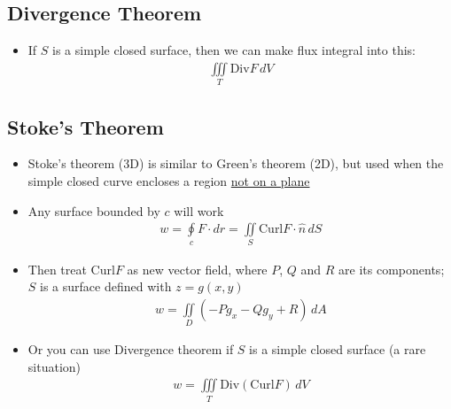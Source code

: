 \documentclass{article}
\begin{document}
\subsection{Divergence Theorem}
\begin{itemize}
  \item If $S$ is a simple closed surface, then we can make flux integral into this:
  \begin{align}
    \iiint\limits_T \textrm{Div}F \, dV
  \end{align}
\end{itemize}

\subsection{Stoke's Theorem}
\begin{itemize}
  \item Stoke's theorem (3D) is similar to Green's theorem (2D), but used when the simple closed curve encloses a region \underline{not on a plane}
  \item Any surface bounded by $c$ will work
  \begin{align}
    w = \oint\limits_c F\cdot dr = \iint\limits_S \textrm{Curl}F\cdot\hat{n} \, dS
  \end{align}
\item Then treat Curl$F$ as new vector field, where $P$, $Q$ and $R$ are its components; $S$ is a surface defined with $z=g(x,y)$
  \begin{align}
    w = \iint\limits_D (-Pg_x - Qg_y + R) \, dA
  \end{align}
  \item Or you can use Divergence theorem if $S$ is a simple closed surface (a rare situation)
  \begin{align}
    w = \iiint\limits_T \textrm{Div}(\textrm{Curl}F) \, dV
  \end{align}
\end{itemize}
\end{document}
